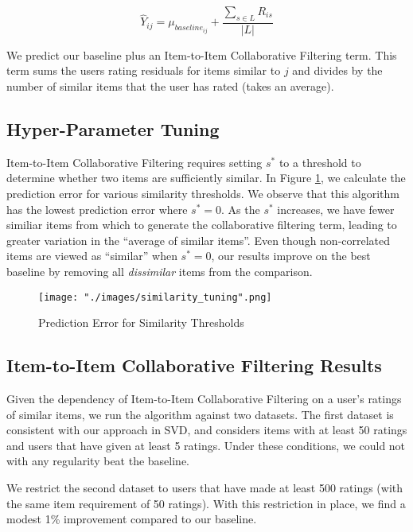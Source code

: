 \documentclass[12pt]{article}
\begin{document}
$$ \hat Y_{ij} = \mu_{baseline_{ij}} + \frac{\sum\limits_{s \in L} R_{is}}{|L|}$$

We predict our baseline plus an Item-to-Item Collaborative Filtering term.\textsuperscript{\cite{gower}} This term sums the users rating residuals for items similar to $j$ and divides by the number of similar items that the user has rated (takes an average).

\subsection*{Hyper-Parameter Tuning}
Item-to-Item Collaborative Filtering requires setting $s^*$ to a threshold to determine whether two items are sufficiently similar. In Figure \ref{fig:similarity_tuning}, we calculate the prediction error for various similarity thresholds. We observe that this algorithm has the lowest prediction error where $s^* = 0$. As the $s^*$ increases, we have fewer similiar items from which to generate the collaborative filtering term, leading to greater variation in the ``average of similar items''. Even though non-correlated items are viewed as ``similar'' when $s^* = 0$, our results improve on the best baseline by removing all \textit{dissimilar} items from the comparison.

\begin{figure}[!ht]
\centering
    \texttt{[image: "./images/similarity\_tuning".png]}
    \caption{Prediction Error for Similarity Thresholds}
    \label{fig:similarity_tuning}
\end{figure}

\subsection*{Item-to-Item Collaborative Filtering Results}

Given the dependency of Item-to-Item Collaborative Filtering on a user's ratings of similar items, we run the algorithm against two datasets. The first dataset is consistent with our approach in SVD, and considers items with at least 50 ratings and users that have given at least 5 ratings. Under these conditions, we could not with any regularity beat the baseline.

We restrict the second dataset to users that have made at least 500 ratings (with the same item requirement of 50 ratings). With this restriction in place, we find a modest 1\% improvement compared to our baseline.
\end{document}
